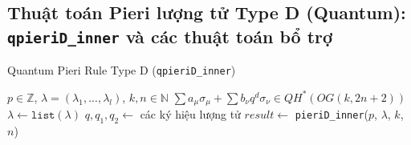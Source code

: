 \subsection*{Thuật toán Pieri lượng tử Type D (Quantum): \texttt{qpieriD\_inner} và các thuật toán bổ trợ}

\begin{algorithm}[H]
\caption{Quantum Pieri Rule Type D (\texttt{qpieriD\_inner})}
\begin{algorithmic}[1]
\REQUIRE $p \in \mathbb{Z}$, $\lambda = (\lambda_1, ..., \lambda_l)$, $k, n \in \mathbb{N}$
\ENSURE $\sum a_\mu \sigma_\mu + \sum b_\nu q^d \sigma_\nu \in QH^*(OG(k,2n+2))$
\STATE $\lambda \gets \mathtt{list}(\lambda)$
\STATE $q, q_1, q_2 \gets$ các ký hiệu lượng tử
\STATE $result \gets$ \texttt{pieriD\_inner}($p$, $\lambda$, $k$, $n$)


\end{algorithmic}
\end{algorithm}
